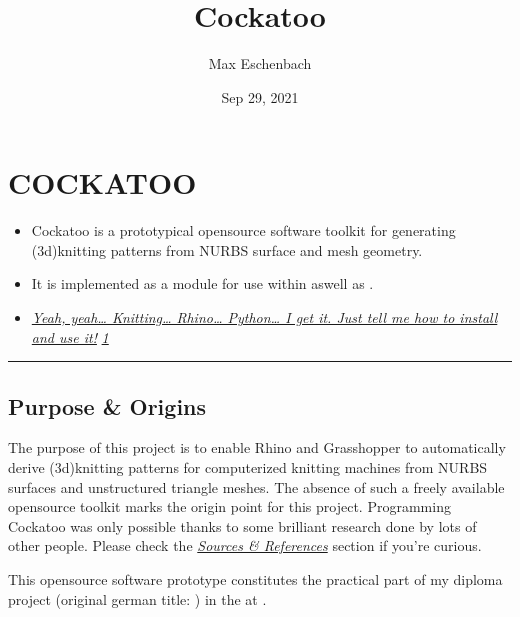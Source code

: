 \documentclass[letterpaper,10pt,english]{sphinxmanual}
\title{Cockatoo}
\date{Sep 29, 2021}
\author{Max Eschenbach}
\begin{document}
\pagestyle{empty}
\sphinxmaketitle
\pagestyle{plain}
\sphinxtableofcontents
\pagestyle{normal}
\label{\detokenize{index::doc}}



\chapter{COCKATOO}
\label{\detokenize{README:cockatoo}}\label{\detokenize{README::doc}}
\begin{itemize}
\item {} 
Cockatoo is a prototypical open\sphinxhyphen{}source software toolkit for
generating (3d\sphinxhyphen{})knitting patterns from NURBS surface and mesh
geometry.

\item {} 
It is implemented as a  module
for use within 
aswell as
.

\item {} 
{\hyperref[\detokenize{README:installation}]{\emph{Yeah, yeah… Knitting… Rhino… Python… I get it. Just tell me
how to install and use it!}}} {\hyperref[\detokenize{README:misc}]{\emph{1}}}

\end{itemize}


\bigskip\hrule\bigskip



\section{Purpose \& Origins}
\label{\detokenize{README:purpose-origins}}\label{\detokenize{README:id1}}
The purpose of this project is to enable Rhino and Grasshopper to
automatically derive (3d\sphinxhyphen{})knitting patterns for computerized knitting
machines from NURBS surfaces and unstructured triangle meshes. The
absence of such a freely available open\sphinxhyphen{}source toolkit marks the origin
point for this project. Programming Cockatoo was only possible thanks to
some brilliant research done by lots of other people. Please check the
{\hyperref[\detokenize{README:sources--references}]{\emph{Sources \& References}}} section if you’re
curious.

This open\sphinxhyphen{}source software prototype constitutes the practical part of my
diploma project  (original german title: ) in the  at
.
\end{document}
